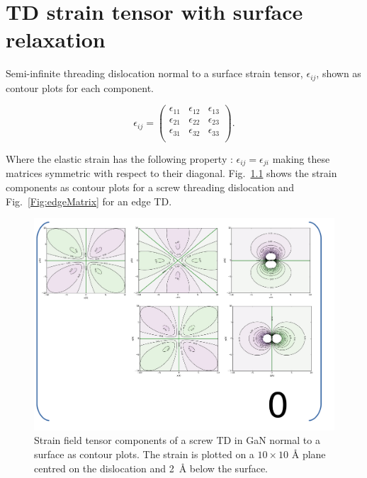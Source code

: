 \chapter{TD strain tensor with surface relaxation}
\label{Chap:strainMatrix}

Semi-infinite threading dislocation normal to a surface strain tensor, $\epsilon_{ij}$,  shown as contour plots for each component. 

\begin{equation*}
    \epsilon_{ij} = \begin{pmatrix}
    \epsilon_{11} & \epsilon_{12} & \epsilon_{13} \\
    \epsilon_{21} & \epsilon_{22} & \epsilon_{23} \\
    \epsilon_{31} & \epsilon_{32} & \epsilon_{33} \\
    \end{pmatrix}.
\end{equation*}

Where the elastic strain has the following property : $\epsilon_{ij}=\epsilon_{ji}$ making these matrices symmetric with respect to their diagonal. Fig.~\ref{Fig:screwMatrix} shows the strain components as contour plots for a screw threading dislocation and   Fig.~\ref{Fig:edgeMatrix} for an edge TD.
\begin{figure}
    \centering
\includegraphics[width=1\linewidth]{Figures/screw_matrix.pdf}
\caption[Screw TD strain tensor.]{Strain field tensor components of a screw TD in GaN normal to a surface as contour plots. The strain is plotted on a $10 \times 10$ \si{\angstrom} plane centred on the dislocation and \SI{2}{\angstrom} below the surface.  }
\label{Fig:screwMatrix}
\end{figure}



